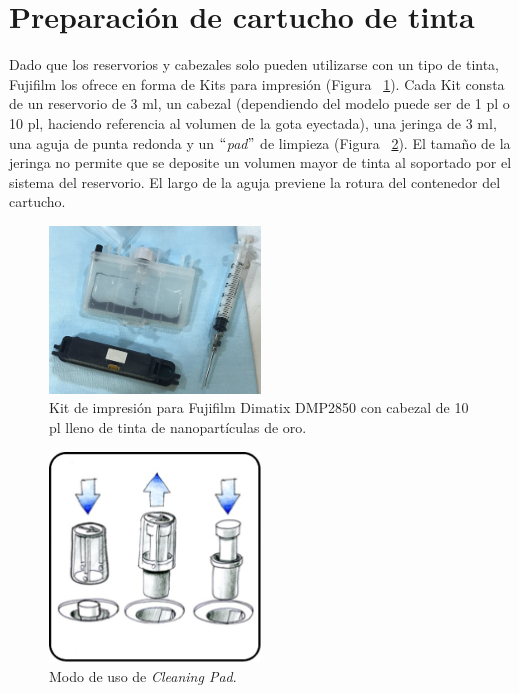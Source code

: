 \section{Preparación de cartucho de tinta}
Dado que los reservorios y cabezales solo pueden utilizarse con un tipo de tinta, Fujifilm los ofrece en forma de Kits para impresión (Figura ~\ref{fig:Figura_kit_impresion}). Cada Kit consta de un reservorio de 3 ml, un cabezal (dependiendo del modelo puede ser de 1 pl o 10 pl, haciendo referencia al volumen de la gota eyectada), una jeringa de 3 ml, una aguja de punta redonda y un $``$\textit{pad}$"$ de limpieza (Figura ~\ref{fig:Figura_Cleaning_pad}). El tamaño de la jeringa no permite que se deposite un volumen mayor de tinta al soportado por el sistema del reservorio. El largo de la aguja previene la rotura del contenedor del cartucho.

\begin{figure}[H]
  \centering
    \includegraphics[width=0.5\textwidth]{Figuras/Figura_kit_impresion}
  \caption{Kit de impresión para Fujifilm Dimatix DMP2850 con cabezal de 10 pl lleno de tinta de nanopartículas de oro.}
  \label{fig:Figura_kit_impresion}
\end{figure}

\begin{figure}[H]
  \centering
    \includegraphics[width=0.5\textwidth]{Figuras/Figura_Cleaning_pad}
  \caption{Modo de uso de \textit{Cleaning Pad}.}
  \label{fig:Figura_Cleaning_pad}
\end{figure}

